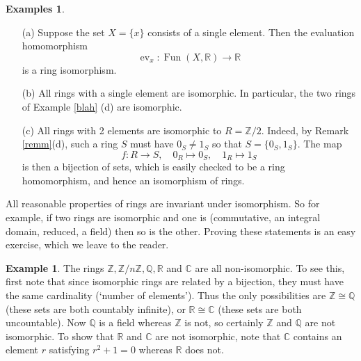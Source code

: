 \documentclass [12pt,oneside,a4paper,mathscr]{amsart}
\theoremstyle{definition}
\newtheorem{example}[thm]{Example}
\newtheorem{examples}[thm]{Examples}
\newcommand {\C}{\mathbb C}
\newcommand{\Q}{\mathbb{Q}}
\newcommand{\R}{\mathbb{R}}
\newcommand{\Z}{\mathbb Z}
\newcommand{\isom}{\cong}
\newcommand{\Fun}{\operatorname{Fun}}
\newcommand{\ev}{\operatorname{ev}}
\begin{document}
\begin{examples}
\begin{itemize}


\item[(a)] Suppose the set $X=\{x\}$ consists of a single element. Then the evaluation homomorphism \[\ev_x\colon \Fun(X,\R)\to \R\]
is a ring isomorphism.
\smallskip

\item[(b)] All rings with a single element are isomorphic. In particular, the two rings of Example \ref{blah} (d) are isomorphic.\smallskip


\item[(c)] All rings with 2 elements are isomorphic to $R=\Z/2$. Indeed, by Remark \ref{remm}(d), such a ring $S$ must have $0_S\neq 1_S$ so that $S=\{0_S, 1_S\}$.  The map \[f\colon R \to S, \quad 0_R\mapsto 0_S, \quad 1_R \mapsto 1_S\]
is then a bijection of sets, which is easily checked to be a ring homomorphism, and hence an isomorphism of rings. 
\end{itemize}
\end{examples}

All reasonable properties of rings are invariant under isomorphism. So for example, if two rings are isomorphic and one is (commutative, an integral domain, reduced, a field) then so is the other. Proving these statements is an easy exercise, which we leave to the reader.

\begin{example}
The rings $\Z, \Z/n\Z, \Q, \R$ and $\C$ are all non-isomorphic. To see this, first  note that since  isomorphic rings are related by a bijection, they must have the same cardinality (`number of elements'). Thus the only possibilities are $\Z \isom \Q$ (these sets are both countably infinite),  or $\R\isom \C$ (these sets are both uncountable). Now $\Q$ is a field whereas $\Z$ is not, so certainly $\Z$ and $\Q$ are not isomorphic. To show that $\R$ and $\C$ are not isomorphic, note that $\C$ contains an element $r$ satisfying $r^2+1=0$ whereas $\R$ does not.
\end{example}
\end{document}
